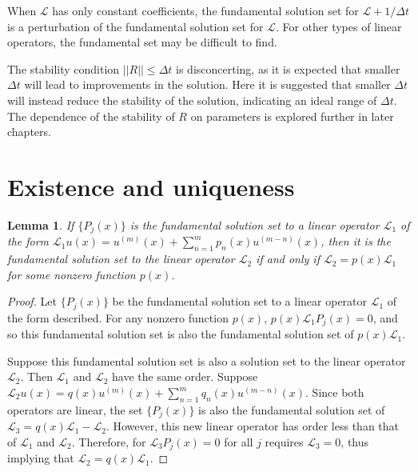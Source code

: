 \documentclass{sfuthesis}
\newtheorem{lemma}{Lemma}
\begin{document}
When $\mathcal{L}$ has only constant coefficients, the fundamental solution set for $\mathcal{L} + 1/\Delta t$ is a perturbation of the fundamental solution set for $\mathcal{L}$.
For other types of linear operators, the fundamental set may be difficult to find.

The stability condition $||R|| \leq \Delta t$ is disconcerting, as it is expected that smaller $\Delta t$ will lead to improvements in the solution.
Here it is suggested that smaller $\Delta t$ will instead reduce the stability of the solution, indicating an ideal range of $\Delta t$.
The dependence of the stability of $R$ on parameters is explored further in later chapters.



\section{Existence and uniqueness}

\begin{lemma} \label{lemma:unique}
If $\{ P_j(x) \}$ is the fundamental solution set to a linear operator $\mathcal{L}_1$ of the form $\mathcal{L}_1 u(x) = u^{(m)}(x) + \sum_{n=1}^m p_n(x) u^{(m-n)}(x)$, then it is the fundamental solution set to the linear operator $\mathcal{L}_2$ if and only if $\mathcal{L}_2 = p(x) \mathcal{L}_1$ for some nonzero function $p(x)$.
\end{lemma}

\begin{proof}
Let $\{ P_j(x) \}$ be the fundamental solution set to a linear operator $\mathcal{L}_1$ of the form described.
For any nonzero function $p(x)$, $p(x) \mathcal{L}_1 P_j(x) = 0$, and so this fundamental solution set is also the fundamental solution set of $p(x) \mathcal{L}_1$.

Suppose this fundamental solution set is also a solution set to the linear operator $\mathcal{L}_2$.
Then $\mathcal{L}_1$ and $\mathcal{L}_2$ have the same order.
Suppose $\mathcal{L}_2 u(x) = q(x) u^{(m)}(x) + \sum_{n=1}^m q_n(x) u^{(m-n)}(x)$.
Since both operators are linear, the set $\{ P_j(x) \}$ is also the fundamental solution set of $\mathcal{L}_3 = q(x) \mathcal{L}_1 - \mathcal{L}_2$.
However, this new linear operator has order less than that of $\mathcal{L}_1$ and $\mathcal{L}_2$.
Therefore, for $\mathcal{L}_3 P_j(x) = 0$ for all $j$ requires $\mathcal{L}_3 = 0$, thus implying that $\mathcal{L}_2 = q(x) \mathcal{L}_1$.
\end{proof}
\end{document}
